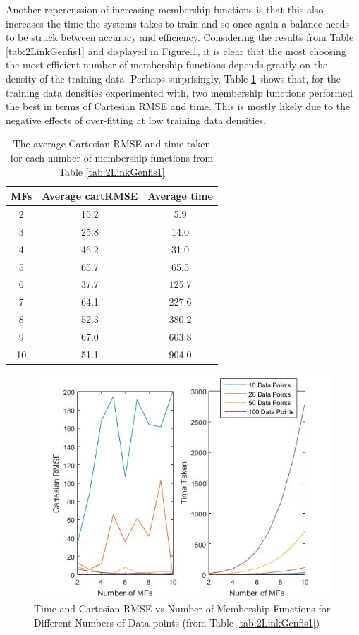 \documentclass[11.5pt, twoside, a4paper]{article}
\begin{document}
Another repercussion of increasing membership functions is that this also increases the time the systems takes to train and so once again a balance needs to be struck between accuracy and efficiency. Considering the results from Table \ref{tab:2LinkGenfis1} and displayed in Figure.\ref{fig:Genfis1}, it is clear that the most choosing the most efficient number of membership functions depends greatly on the density of the training data. Perhaps surprisingly, Table \ref{tab:mfs} shows that, for the training data densities experimented with, two membership functions performed the best in terms of Cartesian RMSE and time. This is mostly likely due to the negative effects of over-fitting at low training data densities.

\begin{table} 
\begin{center}
\begin{tabular}{|c | c | c |} 
\hline
MFs &   Average cartRMSE & Average time \\ \hline \hline
2 & 15.2 &    5.9 \\ \hline
3 & 25.8 &   14.0 \\ \hline
4 & 46.2 &   31.0 \\ \hline
5 & 65.7 &   65.5 \\ \hline
6 & 37.7 &  125.7 \\ \hline
7 & 64.1 &  227.6 \\ \hline
8 & 52.3 &  380.2 \\ \hline
9 & 67.0 &  603.8 \\ \hline
10 & 51.1 & 904.0 \\ \hline
\end{tabular}
\caption{The average Cartesian RMSE and time taken for each number of membership functions from Table \ref{tab:2LinkGenfis1} \label{tab:mfs}}\end{center}
\end{table}

\begin{figure}
\includegraphics[width=\linewidth]{numMFs.jpg}
\caption{Time and Cartesian RMSE vs Number of Membership Functions for Different Numbers of Data points (from Table \ref{tab:2LinkGenfis1})\label{fig:Genfis1}}
\end{figure}
\end{document}
